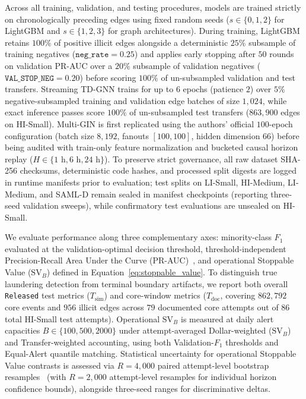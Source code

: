 \documentclass[pdflatex,sn-mathphys,Numbered]{sn-jnl}
\theoremstyle{thmstyleone}
\begin{document}
Across all training, validation, and testing procedures, models are trained strictly on chronologically preceding edges using fixed random seeds ($s \in \{0, 1, 2\}$ for LightGBM and $s \in \{1, 2, 3\}$ for graph architectures). During training, LightGBM retains $100\%$ of positive illicit edges alongside a deterministic $25\%$ subsample of training negatives ($\texttt{neg\_rate} = 0.25$) and applies early stopping after $50$ rounds on validation PR-AUC over a $20\%$ subsample of validation negatives ($\texttt{VAL\_STOP\_NEG} = 0.20$) before scoring $100\%$ of un-subsampled validation and test transfers. Streaming TD-GNN trains for up to $6$ epochs (patience $2$) over $5\%$ negative-subsampled training and validation edge batches of size $1{,}024$, while exact inference passes score $100\%$ of un-subsampled test transfers ($863{,}900$ edges on HI-Small). Multi-GIN is first replicated using the authors' official $100$-epoch configuration (batch size $8{,}192$, fanouts $[100, 100]$, hidden dimension $66$) before being audited with train-only feature normalization and bucketed causal horizon replay ($H \in \{1\text{ h}, 6\text{ h}, 24\text{ h}\}$). To preserve strict governance, all raw dataset SHA-256 checksums, deterministic code hashes, and processed split digests are logged in runtime manifests prior to evaluation; test splits on LI-Small, HI-Medium, LI-Medium, and SAML-D remain sealed in manifest checkpoints (reporting three-seed validation sweeps), while confirmatory test evaluations are unsealed on HI-Small.

We evaluate performance along three complementary axes: minority-class $F_1$ evaluated at the validation-optimal decision threshold, threshold-independent Precision-Recall Area Under the Curve (PR-AUC)~\cite{saito2015prroc}, and operational Stoppable Value ($\text{SV}_B$) defined in Equation~\eqref{eq:stoppable_value}. To distinguish true laundering detection from terminal boundary artifacts, we report both overall \texttt{Released} test metrics ($T_{\text{sim}}$) and core-window metrics ($T_{\text{doc}}$, covering $862{,}792$ core events and $956$ illicit edges across $79$ documented core attempts out of $86$ total HI-Small test attempts). Operational $\text{SV}_B$ is measured at daily alert capacities $B \in \{100, 500, 2000\}$ under attempt-averaged Dollar-weighted ($\text{SV}_B$) and Transfer-weighted accounting, using both Validation-$F_1$ thresholds and Equal-Alert quantile matching. Statistical uncertainty for operational Stoppable Value contrasts is assessed via $R = 4{,}000$ paired attempt-level bootstrap resamples~\cite{efron1993bootstrap} (with $R = 2{,}000$ attempt-level resamples for individual horizon confidence bounds), alongside three-seed ranges for discriminative deltas.
\end{document}

